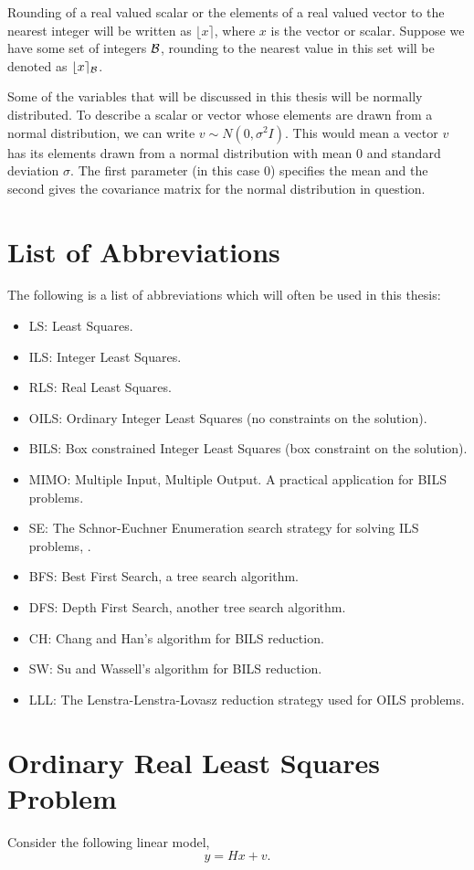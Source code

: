 \documentclass[12pt,Bold,letterpaper]{mcgilletdclass}
\begin{document}
Rounding of a real valued scalar or the elements of a real valued vector to the nearest integer will be written as $\lfloor x \rceil$, where $x$ is the vector or scalar. Suppose we have some set of integers ${\cal B}$, rounding to the nearest value in this set will be denoted as  $\lfloor x \rceil_{{\cal B}}$.

Some of the variables that will be discussed in this thesis will be normally distributed. To describe a scalar or vector whose elements are drawn from a normal distribution, we can write $v \sim N(0,\sigma^2I)$. This would mean a vector $v$ has its elements drawn from a normal distribution with mean $0$ and standard deviation $\sigma$. The first parameter (in this case $0$) specifies the mean and the second gives the covariance matrix for the normal distribution in question.

\section{List of Abbreviations}

The following is a list of abbreviations which will often be used in this thesis:
\begin{itemize}
\item LS: Least Squares.
\item ILS: Integer Least Squares.
\item RLS: Real Least Squares.
\item OILS: Ordinary Integer Least Squares (no constraints on the solution).
\item BILS: Box constrained Integer Least Squares (box constraint on the solution).
\item MIMO: Multiple Input, Multiple Output. A practical application for BILS problems.
\item SE: The Schnor-Euchner Enumeration search strategy for solving ILS problems, \cite{SchE94}.
\item BFS: Best First Search, a tree search algorithm.
\item DFS: Depth First Search, another tree search algorithm.
\item CH: Chang and Han's algorithm for BILS reduction.
\item SW: Su and Wassell's algorithm for BILS reduction.
\item LLL: The Lenstra-Lenstra-Lovasz reduction strategy used for OILS problems.
\end{itemize}

\section{Ordinary Real Least Squares Problem}
Consider the following linear model,
\begin{equation}
\label{eq:realLSModel}
y = Hx+v.
\end{equation}
\end{document}
